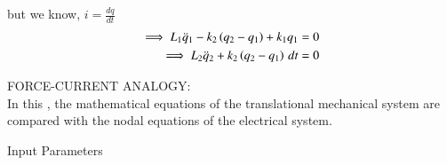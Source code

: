 \documentclass[journal,12pt,onecolumn]{IEEEtran}
\theoremstyle{remark}
\begin{document}
but we know, $i=\frac{dq}{dt}$ 
 \begin{align}
 \implies L_1\ddot q_1 -k_2\left(q_2-q_1\right) + k_1q_1  &=0 \\
 \implies L_2\ddot q_2+k_2\left(q_2-q_1\right) \, dt &=0
\end{align}  

FORCE-CURRENT ANALOGY:\\
In this , the mathematical equations of the translational mechanical system are compared with the nodal equations of the electrical system.


\begin{table}[!ht]    
    \centering
      
      \caption{Input Parameters}
    \label{table:ishitha.g22.nm.54.at1}
\end{table}

\end{document}
